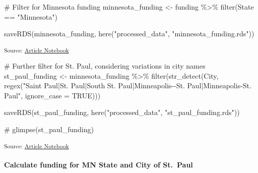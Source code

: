 \documentclass[
  letterpaper,
  DIV=11,
  numbers=noendperiod]{scrartcl}
\let\oldparagraph\paragraph
\renewcommand{\paragraph}[1]{\oldparagraph{#1}\mbox{}}
\newenvironment{Shaded}{\begin{snugshade}}{\end{snugshade}}
\newcommand{\AttributeTok}[1]{\textcolor[rgb]{0.40,0.45,0.13}{#1}}
\newcommand{\CommentTok}[1]{\textcolor[rgb]{0.37,0.37,0.37}{#1}}
\newcommand{\ConstantTok}[1]{\textcolor[rgb]{0.56,0.35,0.01}{#1}}
\newcommand{\FunctionTok}[1]{\textcolor[rgb]{0.28,0.35,0.67}{#1}}
\newcommand{\NormalTok}[1]{\textcolor[rgb]{0.00,0.23,0.31}{#1}}
\newcommand{\OtherTok}[1]{\textcolor[rgb]{0.00,0.23,0.31}{#1}}
\newcommand{\SpecialCharTok}[1]{\textcolor[rgb]{0.37,0.37,0.37}{#1}}
\newcommand{\StringTok}[1]{\textcolor[rgb]{0.13,0.47,0.30}{#1}}
\begin{document}
\begin{Shaded}
\begin{Highlighting}[]
\CommentTok{\# Filter for Minnesota funding}
\NormalTok{minnesota\_funding }\OtherTok{\textless{}{-}}\NormalTok{ funding }\SpecialCharTok{\%\textgreater{}\%}
  \FunctionTok{filter}\NormalTok{(State }\SpecialCharTok{==} \StringTok{"Minnesota"}\NormalTok{)}

\FunctionTok{saveRDS}\NormalTok{(minnesota\_funding, }\FunctionTok{here}\NormalTok{(}\StringTok{"processed\_data"}\NormalTok{, }\StringTok{"minnesota\_funding.rds"}\NormalTok{))}
\end{Highlighting}
\end{Shaded}

\textsubscript{Source:
\href{https://beeckcenter.github.io/climate-equity-workforce/index-preview.html}{Article
Notebook}}

\begin{Shaded}
\begin{Highlighting}[]
\CommentTok{\# Further filter for St. Paul, considering variations in city names}
\NormalTok{st\_paul\_funding }\OtherTok{\textless{}{-}}\NormalTok{ minnesota\_funding }\SpecialCharTok{\%\textgreater{}\%}
  \FunctionTok{filter}\NormalTok{(}\FunctionTok{str\_detect}\NormalTok{(City, }\FunctionTok{regex}\NormalTok{(}\StringTok{"Saint Paul|St. Paul|South St. Paul|Minneapolis{-}{-}St. Paul|Minneapolis{-}St. Paul"}\NormalTok{, }\AttributeTok{ignore\_case =} \ConstantTok{TRUE}\NormalTok{)))}

\FunctionTok{saveRDS}\NormalTok{(st\_paul\_funding, }\FunctionTok{here}\NormalTok{(}\StringTok{"processed\_data"}\NormalTok{, }\StringTok{"st\_paul\_funding.rds"}\NormalTok{))}

\CommentTok{\# glimpse(st\_paul\_funding)}
\end{Highlighting}
\end{Shaded}

\textsubscript{Source:
\href{https://beeckcenter.github.io/climate-equity-workforce/index-preview.html}{Article
Notebook}}

\paragraph{Calculate funding for MN State and City of
St.~Paul}\label{calculate-funding-for-mn-state-and-city-of-st.-paul}
\end{document}
